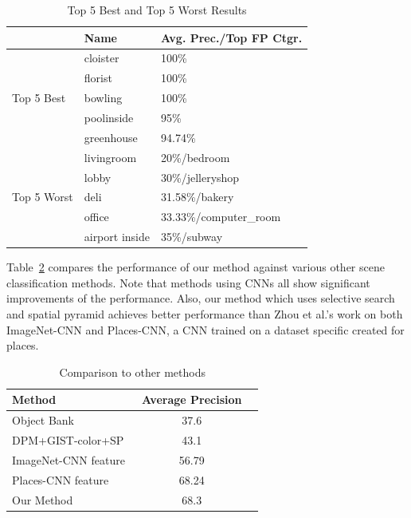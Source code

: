 \begin{table}[ht]
        \caption{Top 5 Best and Top 5 Worst Results}
        \centering
        \begin{tabular}{l l l}
        \hline \hline
        & Name           & Avg. Prec./Top FP Ctgr. \\ \hline
        \multirow{5}{*}{Top 5 Best}
        & cloister       & 100\% \\
        & florist        & 100\% \\
        & bowling        & 100\% \\
        & poolinside     & 95\% \\
        & greenhouse     & 94.74\% \\
        \hline
        \multirow{5}{*}{Top 5 Worst}
        & livingroom     & 20\%/bedroom \\
        & lobby          & 30\%/jelleryshop \\
        & deli           & 31.58\%/bakery \\
        & office         & 33.33\%/computer\_room \\
        & airport inside & 35\%/subway \\
        \hline
        \end{tabular}
        \label{tab:overall}
\end{table}

Table~\ref{tab:compare} compares the performance of our method against various other scene classification methods. Note that methods using CNNs all show significant improvements of the performance.
Also, our method which uses selective search and spatial pyramid achieves better performance than Zhou et al.'s work on both ImageNet-CNN and Places-CNN, a CNN trained on a dataset specific created for places.

\begin{table}[ht]
        \caption{Comparison to other methods}
        \centering
        \begin{tabular}{l c c}
        \hline \hline
        Method                & Average Precision \\ \hline
        Object Bank~\protect\cite{Li:2010:OBA} & 37.6 \\
        DPM+GIST-color+SP~\protect\cite{Pandey:2011:SRW} & 43.1 \\
        ImageNet-CNN feature~\protect\cite{Zhou:2014:LDF} & 56.79 \\
        Places-CNN feature~\protect\cite{Zhou:2014:LDF} & 68.24 \\
        Our Method & 68.3 \\
        \hline
        \end{tabular}
        \label{tab:compare}
\end{table}

